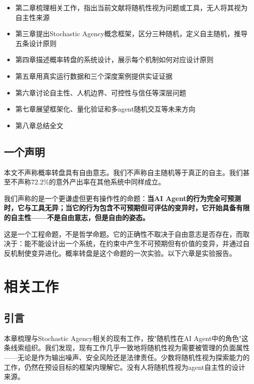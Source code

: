 \documentclass[12pt,a4paper]{ctexart}
\begin{document}
\begin{itemize}[nosep]
\item 第二章梳理相关工作，指出当前文献将随机性视为问题或工具，无人将其视为自主性来源
\item 第三章提出Stochastic Agency概念框架，区分三种随机，定义自主随机，推导五条设计原则
\item 第四章描述概率转盘的系统设计，展示每个机制如何对应设计原则
\item 第五章用真实运行数据和三个深度案例提供实证证据
\item 第六章讨论自主性、人机边界、可控性与信任等深层问题
\item 第七章展望框架化、量化验证和多agent随机交互等未来方向
\item 第八章总结全文
\end{itemize}

\subsection{一个声明}

本文不声称概率转盘具有自由意志。我们不声称自主随机等于真正的自主。我们甚至不声称72.2\%的意外产出率在其他系统中同样成立。

我们声称的是一个更谦虚但更有操作性的命题：\textbf{当AI Agent的行为完全可预测时，它与工具无异；当它的行为包含不可预期但可评估的变异时，它开始具备有限的自主性——不是自由意志，但是自由的姿态。}

这是一个工程命题，不是哲学命题。它的正确性不取决于自由意志是否存在，而取决于：能不能设计出一个系统，在约束中产生不可预期但有价值的变异，并通过自反机制使变异进化。概率转盘是这个命题的一次实验。以下六章是实验报告。


\section{相关工作}

\subsection{引言}

本章梳理与Stochastic Agency相关的现有工作，按"随机性在AI Agent中的角色"这条线索组织。我们发现，现有工作几乎一致地将随机性视为需要被管理的负面属性——无论是作为输出噪声、安全风险还是法律责任。少数将随机性视为探索能力的工作，仍然在预设目标的框架内理解它。没有人将随机性视为agent自主性的设计来源。
\end{document}
